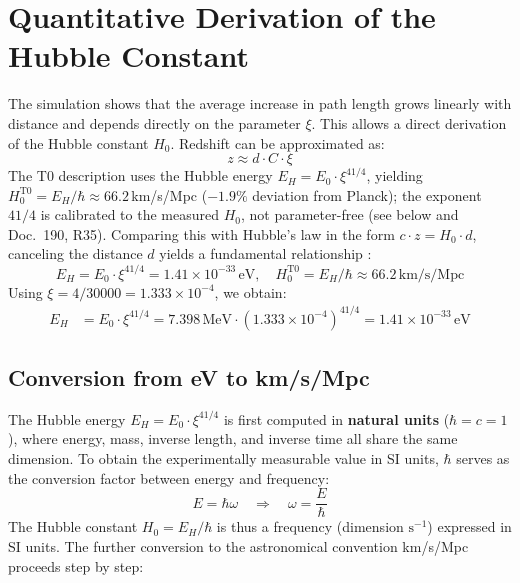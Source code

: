 	\section{Quantitative Derivation of the Hubble Constant}
	The simulation shows that the average increase in path length grows linearly with distance and depends directly on the parameter $\xi$. This allows a direct derivation of the Hubble constant $H_0$.
	Redshift can be approximated as:
	\begin{equation}
		z \approx d \cdot C \cdot \xi
	\end{equation}
	The T0 description uses the Hubble energy $E_H = E_0 \cdot \xi^{41/4}$, yielding $H_0^{\text{T0}} = E_H/\hbar \approx 66.2\,$km/s/Mpc ($-1.9\%$ deviation from Planck); the exponent $41/4$ is calibrated to the measured $H_0$, not parameter-free (see below and Doc.~190, R35).
	Comparing this with Hubble's law in the form $c \cdot z = H_0 \cdot d$, canceling the distance $d$ yields a fundamental relationship \cite{pascher:geometric_formalism}:
	\begin{equation}
		E_H = E_0 \cdot \xi^{41/4} = 1.41 \times 10^{-33}\,\text{eV}, \quad H_0^{\text{T0}} = E_H/\hbar \approx 66.2\,\text{km/s/Mpc}
	\end{equation}
	Using $\xi = 4/30000 = 1.333 \times 10^{-4}$, we obtain:
	\begin{align*}
		E_H &= E_0 \cdot \xi^{41/4} = 7.398\,\text{MeV} \cdot (1.333 \times 10^{-4})^{41/4} = 1.41 \times 10^{-33}\,\text{eV}
	\end{align*}
	
	\subsection{Conversion from eV to km/s/Mpc}
	
	The Hubble energy $E_H = E_0 \cdot \xi^{41/4}$ is first computed in \textbf{natural units} ($\hbar = c = 1$), where energy, mass, inverse length, and inverse time all share the same dimension. To obtain the experimentally measurable value in SI units, $\hbar$ serves as the conversion factor between energy and frequency:
	\begin{equation}
		E = \hbar \omega \quad \Longrightarrow \quad \omega = \frac{E}{\hbar}
	\end{equation}
	The Hubble constant $H_0 = E_H/\hbar$ is thus a frequency (dimension $\text{s}^{-1}$) expressed in SI units. The further conversion to the astronomical convention km/s/Mpc proceeds step by step:
	
